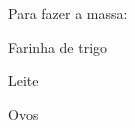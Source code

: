 Para fazer a massa:
\begin{compactenum}[a)]
\item Farinha de trigo
\item Leite
\item Ovos
\end{compactenum}
